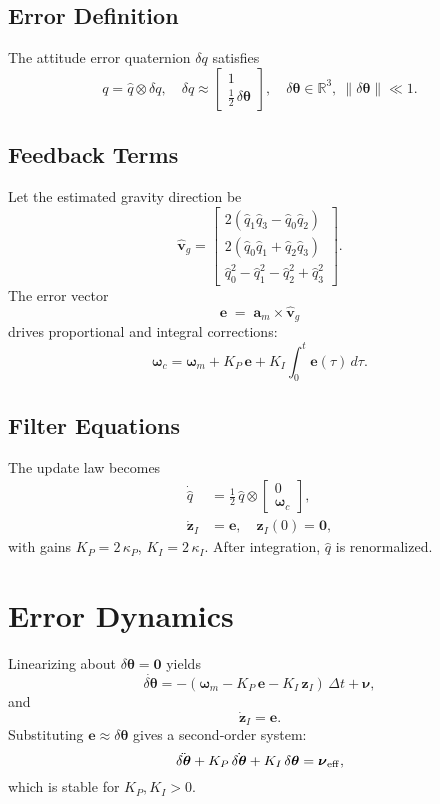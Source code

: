 \documentclass[12pt]{article}
\begin{document}
\subsection{Error Definition}
The attitude error quaternion \(\delta q\) satisfies
\[
q = \hat q \otimes \delta q,
\quad
\delta q \approx \begin{bmatrix}1\\\tfrac12\,\delta\boldsymbol\theta\end{bmatrix},\quad
\delta\boldsymbol\theta\in\mathbb R^3,\ \|\delta\boldsymbol\theta\|\ll1.
\]

\subsection{Feedback Terms}
Let the estimated gravity direction be
\[
\hat{\mathbf v}_g
= \begin{bmatrix}
2(\hat q_1\hat q_3 - \hat q_0\hat q_2)\\
2(\hat q_0\hat q_1 + \hat q_2\hat q_3)\\
\hat q_0^2 - \hat q_1^2 - \hat q_2^2 + \hat q_3^2
\end{bmatrix}.
\]
The error vector
\[
\mathbf e \;=\; \mathbf a_m \times \hat{\mathbf v}_g
\]
drives proportional and integral corrections:
\[
\boldsymbol\omega_c
= \boldsymbol\omega_m
+ K_P\,\mathbf e
+ K_I\!\int_0^t\mathbf e(\tau)\,d\tau.
\]

\subsection{Filter Equations}
The update law becomes
\begin{align}
\dot{\hat q} &= \tfrac12\,\hat q \otimes \begin{bmatrix}0\\\boldsymbol\omega_c\end{bmatrix},\label{eq:propagate}\\
\dot{\mathbf z}_I &=  \mathbf e,\quad
\mathbf z_I(0)=\mathbf0,\label{eq:integral}
\end{align}
with gains \(K_P=2\,\kappa_P\), \(K_I=2\,\kappa_I\).  After integration, \(\hat q\) is renormalized.

\section{Error Dynamics}
Linearizing about \(\delta\boldsymbol\theta=\mathbf0\) yields
\[
\dot{\delta\boldsymbol\theta}
= -(\boldsymbol\omega_m - K_P\,\mathbf e - K_I\,\mathbf z_I)\,\Delta t + \boldsymbol\nu,
\]
and
\[
\dot{\mathbf z}_I = \mathbf e.
\]
Substituting \(\mathbf e \approx \delta\boldsymbol\theta\) gives a second‐order system:
\[
\ddot{\delta\boldsymbol\theta} + K_P\,\dot{\delta\boldsymbol\theta} + K_I\,\delta\boldsymbol\theta = \boldsymbol\nu_{\rm eff},
\]
which is stable for \(K_P,K_I>0\).
\end{document}
